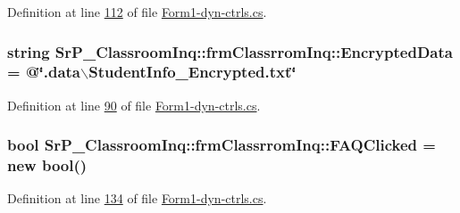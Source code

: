 \-Definition at line \hyperlink{_form1-dyn-ctrls_8cs_source_l00112}{112} of file \hyperlink{_form1-dyn-ctrls_8cs_source}{\-Form1-\/dyn-\/ctrls.\-cs}.

\hypertarget{class_sr_p___classroom_inq_1_1frm_classrrom_inq_a3128c84ccd476a8a2e02bedab0ecc031}{
\subsubsection[{\-Encrypted\-Data}]{\setlength{\rightskip}{0pt plus 5cm}string {\bf \-Sr\-P\-\_\-\-Classroom\-Inq\-::frm\-Classrrom\-Inq\-::\-Encrypted\-Data} = @\char`\"{}.data$\backslash$\-Student\-Info\-\_\-\-Encrypted.\-txt\char`\"{}}}
\label{class_sr_p___classroom_inq_1_1frm_classrrom_inq_a3128c84ccd476a8a2e02bedab0ecc031}


\-Definition at line \hyperlink{_form1-dyn-ctrls_8cs_source_l00090}{90} of file \hyperlink{_form1-dyn-ctrls_8cs_source}{\-Form1-\/dyn-\/ctrls.\-cs}.

\hypertarget{class_sr_p___classroom_inq_1_1frm_classrrom_inq_a2b3fd84c890215dd61c54946b49906d2}{
\subsubsection[{\-F\-A\-Q\-Clicked}]{\setlength{\rightskip}{0pt plus 5cm}bool {\bf \-Sr\-P\-\_\-\-Classroom\-Inq\-::frm\-Classrrom\-Inq\-::\-F\-A\-Q\-Clicked} = new bool()}}
\label{class_sr_p___classroom_inq_1_1frm_classrrom_inq_a2b3fd84c890215dd61c54946b49906d2}


\-Definition at line \hyperlink{_form1-dyn-ctrls_8cs_source_l00134}{134} of file \hyperlink{_form1-dyn-ctrls_8cs_source}{\-Form1-\/dyn-\/ctrls.\-cs}.

